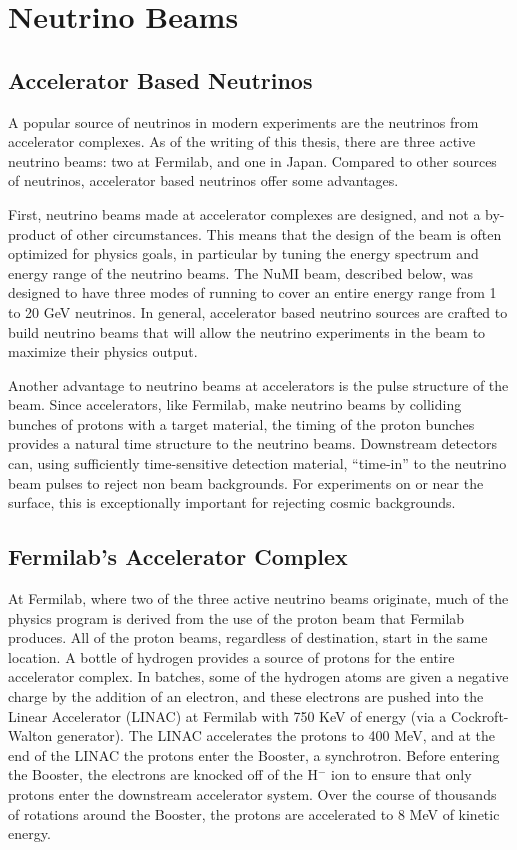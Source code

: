 \chapter{Neutrino Beams}


\section{Accelerator Based Neutrinos}

A popular source of neutrinos in modern experiments are the neutrinos from accelerator complexes.  As of the writing of this thesis, there are three active neutrino beams: two at Fermilab, and one in Japan.  Compared to other sources of neutrinos, accelerator based neutrinos offer some advantages.

First, neutrino beams made at accelerator complexes are designed, and not a by-product of other circumstances.  This means that the design of the beam is often optimized for physics goals, in particular by tuning the energy spectrum and energy range of the neutrino beams.  The NuMI beam, described below, was designed to have three modes of running to cover an entire energy range from 1 to 20 GeV neutrinos.  In general, accelerator based neutrino sources are crafted to build neutrino beams that will allow the neutrino experiments in the beam to maximize their physics output.

Another advantage to neutrino beams at accelerators is the pulse structure of the beam.  Since accelerators, like Fermilab, make neutrino beams by colliding bunches of protons with a target material, the timing of the proton bunches provides a natural time structure to the neutrino beams.  Downstream detectors can, using sufficiently time-sensitive detection material, ``time-in'' to the neutrino beam pulses to reject non beam backgrounds.  For experiments on or near the surface, this is exceptionally important for rejecting cosmic backgrounds.

\section{Fermilab's Accelerator Complex}

At Fermilab, where two of the three active neutrino beams originate, much of the physics program is derived from the use of the proton beam that Fermilab produces.  All of the proton beams, regardless of destination, start in the same location.  A bottle of hydrogen provides a source of protons for the entire accelerator complex.  In batches, some of the hydrogen atoms are given a negative charge by the addition of an electron, and these electrons are pushed into the Linear Accelerator (LINAC) at Fermilab with 750 KeV of energy (via a Cockroft-Walton generator).  The LINAC accelerates the protons to 400 MeV, and at the end of the LINAC the protons enter the Booster, a synchrotron.  Before entering the Booster, the electrons are knocked off of the H$^-$ ion to ensure that only protons enter the downstream accelerator system.  Over the course of thousands of rotations around the Booster, the protons are accelerated to 8 MeV of kinetic energy.

